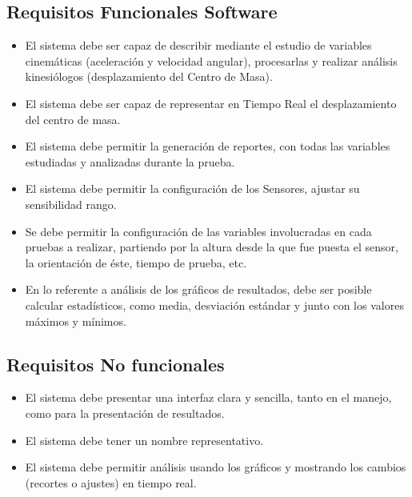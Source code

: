 \documentclass[12pt,a4paper]{article}
\begin{document}
\subsection{Requisitos Funcionales Software}
\begin{itemize}
	\item El sistema debe ser capaz de describir mediante el estudio de variables cinemáticas (aceleración y velocidad angular), procesarlas y realizar análisis kinesiólogos (desplazamiento del Centro de Masa).
	\item El sistema debe ser capaz de representar en Tiempo Real el desplazamiento del centro de masa.
	\item El sistema debe permitir la generación de reportes, con todas las variables estudiadas y analizadas durante la prueba.
	\item El sistema debe permitir la configuración de los Sensores, ajustar su sensibilidad rango.
	\item Se debe permitir la configuración de las variables involucradas en cada pruebas a realizar, partiendo por la altura desde la que fue puesta el sensor, la orientación de éste, tiempo de prueba, etc.
	\item En lo referente a análisis de los gráficos de resultados, debe ser posible calcular estadísticos, como media, desviación estándar y junto con los valores máximos y mínimos.
\end{itemize} 

\subsection{Requisitos No funcionales}
\begin{itemize}
	\item El sistema debe presentar una interfaz clara y sencilla, tanto en el manejo, como para la presentación de resultados.
	\item El sistema debe tener un nombre representativo.
	\item El sistema debe permitir análisis usando los gráficos y mostrando los cambios (recortes o ajustes) en tiempo real.
\end{itemize}

\newpage
\end{document}
